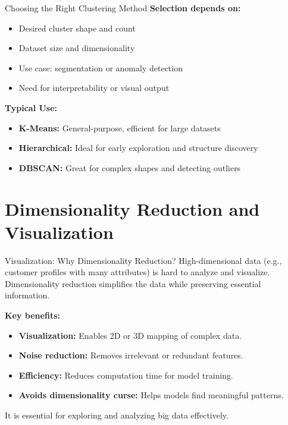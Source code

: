 \documentclass[aspectratio=169, table]{beamer}
\begin{document}
\begin{frame}{Choosing the Right Clustering Method}
	\textbf{Selection depends on:}
	\begin{itemize}
		\item Desired cluster shape and count
		\item Dataset size and dimensionality
		\item Use case: segmentation or anomaly detection
		\item Need for interpretability or visual output
	\end{itemize}
	
	\textbf{Typical Use:}
	\begin{itemize}
		\item \textbf{K-Means:} General-purpose, efficient for large datasets
		\item \textbf{Hierarchical:} Ideal for early exploration and structure discovery
		\item \textbf{DBSCAN:} Great for complex shapes and detecting outliers
	\end{itemize}
\end{frame}


\section{Dimensionality Reduction and Visualization}

\begin{frame}{Visualization: Why Dimensionality Reduction?}
	High-dimensional data (e.g., customer profiles with many attributes) is hard to analyze and visualize. Dimensionality reduction simplifies the data while preserving essential information.
	
	\textbf{Key benefits:}
	\begin{itemize}
		\item \textbf{Visualization:} Enables 2D or 3D mapping of complex data.
		\item \textbf{Noise reduction:} Removes irrelevant or redundant features.
		\item \textbf{Efficiency:} Reduces computation time for model training.
		\item \textbf{Avoids dimensionality curse:} Helps models find meaningful patterns.
	\end{itemize}
	
	It is essential for exploring and analyzing big data effectively.
\end{frame}
\end{document}
